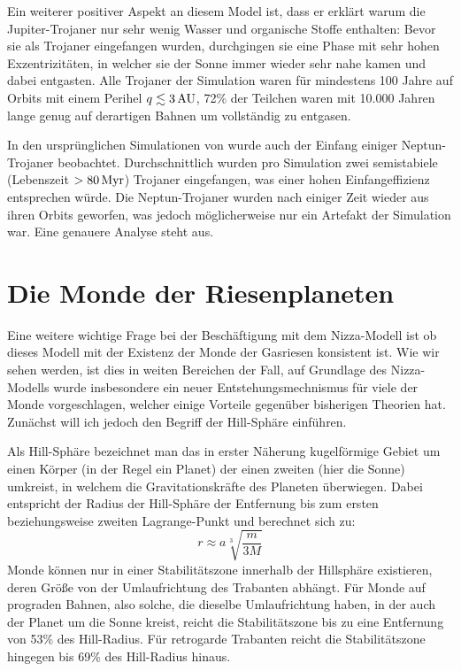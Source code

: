 \documentclass[12pt,a4paper,twoside]{article}
\renewcommand{\cite}{\citep}
\begin{document}
Ein weiterer positiver Aspekt an diesem Model ist, dass er erklärt warum die Jupiter-Trojaner nur sehr wenig Wasser und organische Stoffe enthalten: %
Bevor sie als Trojaner eingefangen wurden, durchgingen sie eine Phase mit sehr hohen Exzentrizitäten, in welcher sie der Sonne immer wieder sehr nahe kamen und dabei entgasten.
Alle Trojaner der Simulation waren für mindestens 100 Jahre auf Orbits mit einem Perihel $q\lesssim \unit[3]{AU}$, 72\% der Teilchen waren mit 10.000 Jahren lange genug auf derartigen Bahnen um vollständig zu entgasen\cite{Morbidelli2005}.

In den ursprünglichen Simulationen von \cite{Tsiganis2005} wurde auch der Einfang einiger Neptun-Trojaner beobachtet. Durchschnittlich wurden pro Simulation zwei semistabiele (Lebenszeit $>\unit[80]{Myr}$) Trojaner eingefangen, was einer hohen Einfangeffizienz entsprechen würde\cite{Tsiganis2005}.
Die Neptun-Trojaner wurden nach einiger Zeit wieder aus ihren Orbits geworfen, was jedoch möglicherweise nur ein Artefakt der Simulation war\cite{Tsiganis2005}. %
Eine genauere Analyse steht aus. %

\FloatBarrier
\section{Die Monde der Riesenplaneten}\label{Monde}
Eine weitere wichtige Frage bei der Beschäftigung mit dem Nizza-Modell ist ob dieses Modell mit der Existenz der Monde der Gasriesen konsistent ist.
Wie wir sehen werden, ist dies in weiten Bereichen der Fall, auf Grundlage des Nizza-Modells wurde insbesondere ein neuer Entstehungsmechnismus für viele der Monde vorgeschlagen, welcher einige Vorteile gegenüber bisherigen Theorien hat. Zunächst will ich jedoch den Begriff der Hill-Sphäre einführen.

Als Hill-Sphäre bezeichnet man das in erster Näherung kugelförmige Gebiet um einen Körper (in der Regel ein Planet) der einen zweiten (hier die Sonne) umkreist, in welchem die Gravitationskräfte des Planeten überwiegen. Dabei entspricht der Radius der Hill-Sphäre der Entfernung bis zum ersten beziehungsweise zweiten Lagrange-Punkt und berechnet sich zu\cite{Sheppard2005}:
\begin{equation} 
r \approx a \sqrt[3]{\frac{m}{3 M}}
\end{equation} %
Monde können nur in einer Stabilitätszone innerhalb der Hillsphäre existieren, deren Größe von der Umlaufrichtung des Trabanten abhängt. Für Monde auf prograden Bahnen, also solche, die dieselbe Umlaufrichtung haben, in der auch der Planet um die Sonne kreist, reicht die Stabilitätszone bis zu eine Entfernung von 53\% des Hill-Radius.
Für retrogarde Trabanten reicht die Stabilitätszone hingegen bis 69\% des Hill-Radius hinaus\cite{Hamilton1997}.
\end{document}

